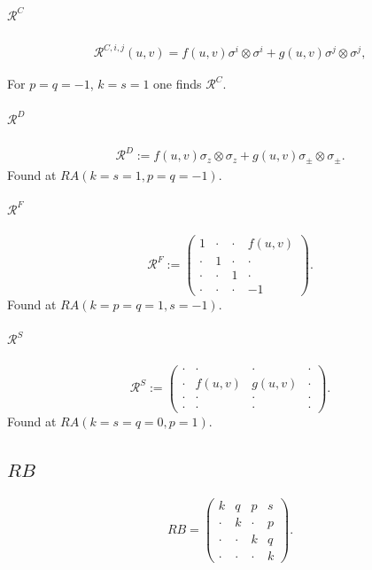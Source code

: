 \documentclass{article}
\begin{document}
\paragraph{$\mathcal{R}^C$}
\begin{align}
    \mathcal{R}^{C,i,j}(u,v)= f(u,v) \sigma^i \otimes \sigma^i + g(u,v) \sigma^j \otimes \sigma^j,
\end{align}



For $p=q=-1$, $k=s=1$ one finds $\mathcal{R}^C$.


\paragraph{$\mathcal{R}^D$}
\begin{align}
\label{RD}
    \mathcal{R}^D:=f(u,v) \sigma_z \otimes \sigma_z +g(u,v) \sigma_{\pm} \otimes \sigma_{\pm}.
\end{align}
Found at $RA(k=s=1,p=q=-1)$. 
\paragraph{$\mathcal{R}^F$}
\begin{equation}
\label{RF}
   \mathcal{R}^F:= \begin{pmatrix}
        1&\cdot&\cdot&f(u,v)\\
        \cdot&1&\cdot&\cdot\\
        \cdot&\cdot&1&\cdot\\
        \cdot&\cdot&\cdot&-1
    \end{pmatrix} .
\end{equation}
Found at $RA(k=p=q=1,s=-1)$.
\paragraph{$\mathcal{R}^S$}
\begin{equation}
\label{RS}
   \mathcal{R}^S:= \begin{pmatrix}
        \cdot&\cdot&\cdot&\cdot\\
        \cdot&f(u,v)&g(u,v)&\cdot\\
        \cdot&\cdot&\cdot&\cdot\\
        \cdot&\cdot&\cdot&\cdot
    \end{pmatrix} .
\end{equation}
Found at $RA(k=s=q=0,p=1)$.

\subsection{$RB$}
\label{sec:RB}
\begin{equation}
   RB= \begin{pmatrix}
        k&q&p&s\\
        \cdot&k&\cdot&p\\
        \cdot&\cdot&k&q\\
        \cdot&\cdot&\cdot&k
    \end{pmatrix}.
\end{equation}
\end{document}
